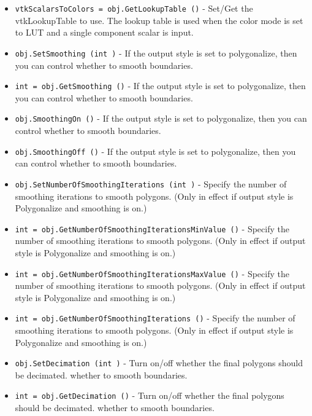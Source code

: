 \begin{itemize}
\item  \verb|vtkScalarsToColors = obj.GetLookupTable ()| -  Set/Get the vtkLookupTable to use. The lookup table is used when the
 color mode is set to LUT and a single component scalar is input.

\item  \verb|obj.SetSmoothing (int )| -  If the output style is set to polygonalize, then you can control
 whether to smooth boundaries.

\item  \verb|int = obj.GetSmoothing ()| -  If the output style is set to polygonalize, then you can control
 whether to smooth boundaries.

\item  \verb|obj.SmoothingOn ()| -  If the output style is set to polygonalize, then you can control
 whether to smooth boundaries.

\item  \verb|obj.SmoothingOff ()| -  If the output style is set to polygonalize, then you can control
 whether to smooth boundaries.

\item  \verb|obj.SetNumberOfSmoothingIterations (int )| -  Specify the number of smoothing iterations to smooth polygons. (Only
 in effect if output style is Polygonalize and smoothing is on.)

\item  \verb|int = obj.GetNumberOfSmoothingIterationsMinValue ()| -  Specify the number of smoothing iterations to smooth polygons. (Only
 in effect if output style is Polygonalize and smoothing is on.)

\item  \verb|int = obj.GetNumberOfSmoothingIterationsMaxValue ()| -  Specify the number of smoothing iterations to smooth polygons. (Only
 in effect if output style is Polygonalize and smoothing is on.)

\item  \verb|int = obj.GetNumberOfSmoothingIterations ()| -  Specify the number of smoothing iterations to smooth polygons. (Only
 in effect if output style is Polygonalize and smoothing is on.)

\item  \verb|obj.SetDecimation (int )| -  Turn on/off whether the final polygons should be decimated.
 whether to smooth boundaries.

\item  \verb|int = obj.GetDecimation ()| -  Turn on/off whether the final polygons should be decimated.
 whether to smooth boundaries.


\end{itemize}
